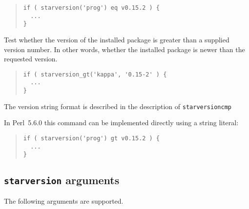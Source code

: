 \documentclass[twoside,11pt]{article}
\newenvironment{myquote}{\begin{quote}\begin{small}}{\end{small}\end{quote}}
\newcommand{\perl}{\xref{\textsf{Perl}}{sun193}{}}
\newcommand{\xref}[3]{#1}
\renewcommand{\_}{\texttt{\symbol{95}}}
\begin{document}
\begin{description}
\begin{myquote}
\begin{verbatim}
if ( starversion('prog') eq v0.15.2 ) {
  ...
}
\end{verbatim}
\end{myquote}

\item[starversion\_gt] \mbox{}

Test whether the version of the installed package is greater than 
a supplied version number. In other words, whether the installed
package is newer than the requested version.

\begin{myquote}
\begin{verbatim}
if ( starversion_gt('kappa', '0.15-2' ) {
  ...
}
\end{verbatim}
\end{myquote}

The version string format is described in the description of
\texttt{starversion\_cmp}



In \perl\ 5.6.0 this command can be implemented directly using a 
string literal:

\begin{myquote}
\begin{verbatim}
if ( starversion('prog') gt v0.15.2 ) {
  ...
}
\end{verbatim}
\end{myquote}

\end{description}

\subsection{\texttt{starversion} arguments\label{starversion}}

The following arguments are supported.
\end{document}

